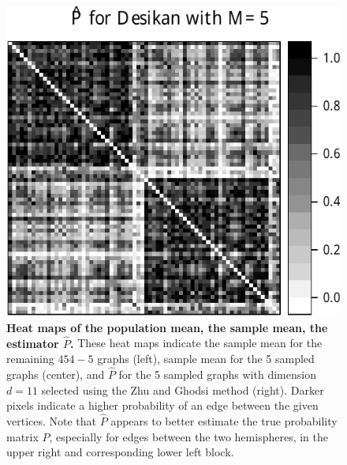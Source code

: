 \documentclass[10pt,letterpaper]{article}
\renewcommand{\hat}{\widehat}
\begin{document}
\begin{figure}[!htb]
\includegraphics[height=.186\textheight]{Phat_desikan_m5.pdf}
\caption{{\bf Heat maps of the population mean, the sample mean, the estimator $\hat{P}$.}
These heat maps indicate the sample mean for the remaining $454-5$ graphs (left), sample mean for the 5 sampled graphs (center), and $\hat{P}$ for the 5 sampled graphs with dimension $d=11$ selected using the Zhu and Ghodsi method (right).
Darker pixels indicate a higher probability of an edge between the given vertices.
Note that $\hat{P}$ appears to better estimate the true probability matrix $P$, especially for edges between the two hemispheres, in the upper right and corresponding lower left block.
}
\label{fig:Matrix_desikan_m5}
\end{figure}
\end{document}
